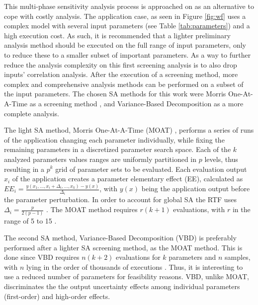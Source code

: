 This multi-phase sensitivity analysis process is approached on \cite{sa2} as an alternative to cope with costly analysis. The application case, as seen in Figure \ref{fig:wf} uses a complex model with several input parameters (see Table \ref{tab:parameters}) and a high execution cost. As such, it is recommended that a lighter preliminary analysis method should be executed on the full range of input parameters, only to reduce these to a smaller subset of important parameters. As a way to further reduce the analysis complexity on this first screening analysis is to also drop inputs' correlation analysis. After the execution of a screening method, more complex and comprehensive analysis methods can be performed on a subset of the input parameters. The chosen SA methods for this work were Morris One-At-A-Time as a screening method \cite{moat}, and Variance-Based Decomposition as a more complete analysis.

The light SA method, Morris One-At-A-Time (MOAT) \cite{moat}, performs a series of runs of the application changing each parameter individually, while fixing the remaining parameters in a discretized parameter search space. Each of the $k$ analyzed parameters values ranges are uniformly partitioned in $p$ levels, thus resulting in a $p^k$ grid of parameter sets to be evaluated. Each evaluation output $x_i$ of the application creates a parameter elementary effect (EE), calculated as $EE_i = \frac{y(x_1, ..., x_i + \Delta_i, ..., x_k)-y(x)}{\Delta_i}$, with $y(x)$ being the application output before the parameter perturbation. In order to account for global SA the RTF uses $\Delta_i = \frac{p}{2(p-1)}$ \cite{rtf2}. The MOAT method requires $r(k+1)$ evaluations, with $r$ in the range of 5 to 15 \cite{moat2}.

The second SA method, Variance-Based Decomposition (VBD) is preferably performed after a lighter SA screening method, as the MOAT method. This is done since VBD requires $n(k+2)$ evaluations for $k$ parameters and $n$ samples, with $n$ lying in the order of thousands of executions \cite{vbd}. Thus, it is interesting to use a reduced number of parameters for feasibility reasons. VBD, unlike MOAT, discriminates the the output uncertainty effects among individual parameters (first-order) and high-order effects.

